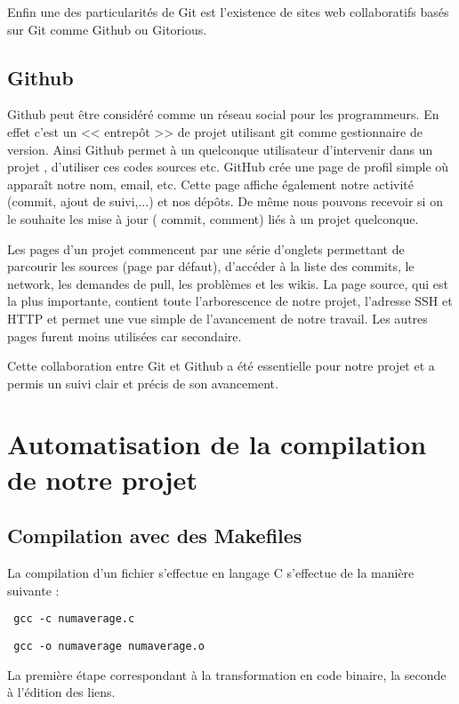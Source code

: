 Enfin une des particularit\'es de Git est l'existence de sites web collaboratifs bas\'es sur Git comme Github ou Gitorious. 

\subsection{Github}

Github peut \^etre consid\'er\'e comme un r\'eseau social pour les programmeurs. En effet c'est un << entrep\^ot >> de projet utilisant git comme 
gestionnaire de version. Ainsi Github permet \`a un quelconque utilisateur d'intervenir dans un projet , d'utiliser ces codes sources etc.
GitHub cr\'ee une page de profil simple o\`u appara\^it notre nom, email, etc. Cette page affiche \'egalement notre activit\'e (commit, ajout de suivi,...)
 et nos d\'ep\^ots. De m\^eme nous pouvons recevoir si on le souhaite les mise \`a  jour ( commit, comment) li\'es \`a un projet quelconque.

Les pages d'un projet commencent par une s\'erie d'onglets permettant de parcourir les sources (page par d\'efaut), d'acc\'eder \`a la liste des
 commits, le network, les demandes de pull, les probl\`emes et les wikis.
La page source, qui est la plus importante, contient toute l'arborescence de notre projet, l'adresse SSH et HTTP et permet une vue simple
 de l'avancement de notre travail.
Les autres pages furent moins utilis\'ees car secondaire. 

Cette collaboration entre Git et Github a \'et\'e essentielle pour notre projet et a permis un suivi clair et pr\'ecis de son avancement.

\section{Automatisation de la compilation de notre projet}
\subsection{Compilation avec des Makefiles}

La compilation d'un fichier s'effectue en langage C s'effectue de la mani\`ere suivante :
\begin{verbatim} gcc -c numaverage.c\end{verbatim}
\begin{verbatim} gcc -o numaverage numaverage.o\end{verbatim}

La premi\`ere \'etape correspondant \`a la transformation en code binaire, la seconde \`a l'\'edition des liens.

